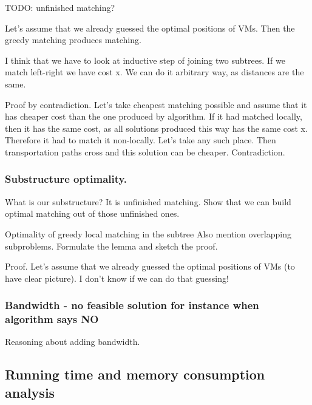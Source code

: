 TODO: unfinished matching?

Let's assume that we already guessed the optimal positions of VMs. Then the greedy matching produces matching.

I think that we have to look at inductive step of joining two subtrees. If we match left-right we have cost x. We can do it arbitrary way, as
distances are the same.

Proof by contradiction. Let's take cheapest matching possible and assume that it has cheaper cost than the one produced by algorithm. If it had matched locally, then it has the same cost, as all solutions produced this way has the same cost x. Therefore it had to match it non-locally. Let's take any such place.
Then transportation paths cross and this solution can be cheaper. Contradiction.

\subsubsection{Substructure optimality.}

What is our substructure? It is unfinished matching. Show that we can build optimal matching out of those unfinished ones.

Optimality of greedy local matching in the subtree
Also mention overlapping subproblems.
Formulate the lemma and sketch the proof.

Proof. Let's assume that we already guessed the optimal positions of VMs (to have clear picture). I don't know if we can do that guessing!

\subsubsection{Bandwidth - no feasible solution for instance when algorithm says NO}

Reasoning about adding bandwidth.

\subsection{Running time and memory consumption analysis}
